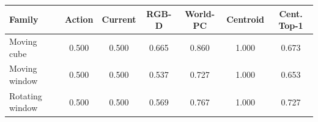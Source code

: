 \begin{tabular}{lcccccc}
\toprule
Family & Action & Current & RGB-D & World-PC & Centroid & Cent. Top-1 \\
\midrule
Moving cube & 0.500 & 0.500 & 0.665 & 0.860 & 1.000 & 0.673 \\
Moving window & 0.500 & 0.500 & 0.537 & 0.727 & 1.000 & 0.653 \\
Rotating window & 0.500 & 0.500 & 0.569 & 0.767 & 1.000 & 0.727 \\
\bottomrule
\end{tabular}
